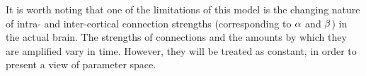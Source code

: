 It is worth noting that one of the limitations of this model is the changing nature of intra- and inter-cortical connection strengths (corresponding to $\alpha$ and $\beta$) in the actual brain.
The strengths of connections and the amounts by which they are amplified vary in time.
However, they will be treated as constant, in order to present a view of parameter space.

